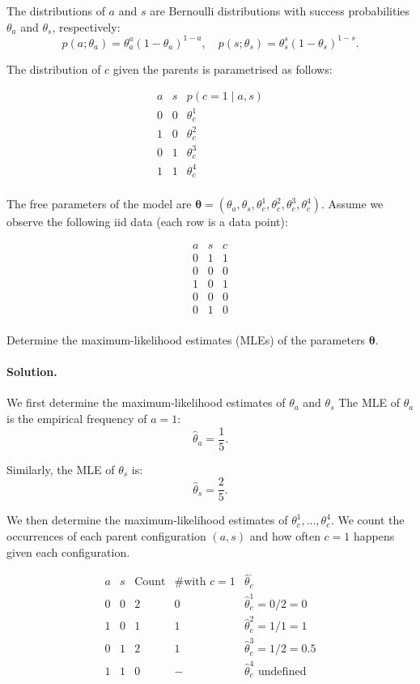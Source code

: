 \documentclass[11pt]{article}
\newif\ifshowanswers
\begin{document}
\noindent
The distributions of $a$ and $s$ are Bernoulli distributions with success probabilities $\theta_a$ and $\theta_s$, respectively:
\[
p(a; \theta_a) = \theta_a^a (1 - \theta_a)^{1 - a}, \quad p(s; \theta_s) = \theta_s^s (1 - \theta_s)^{1 - s}.
\]

\noindent
The distribution of $c$ given the parents is parametrised as follows:

\[
\begin{array}{cc|c}
  a & s & p(c = 1 \mid a, s) \\
\hline
0 & 0 & \theta_c^1 \\
1 & 0 & \theta_c^2 \\
0 & 1 & \theta_c^3 \\
1 & 1 & \theta_c^4 \\
\end{array}
\]

\noindent
The free parameters of the model are $\bm{\theta} = (\theta_a, \theta_s, \theta_c^1, \theta_c^2, \theta_c^3, \theta_c^4)$. Assume we observe the following iid data (each row is a data point):

\[
\begin{array}{cc|c}
a & s & c \\
\hline
0 & 1 & 1 \\
0 & 0 & 0 \\
1 & 0 & 1 \\
0 & 0 & 0 \\
0 & 1 & 0 \\
\end{array}
\]

\noindent
Determine the maximum-likelihood estimates (MLEs) of the parameters $\bm{\theta}$.

\ifshowanswers
\paragraph{Solution.}
We first determine the maximum-likelihood estimates of $\theta_a$ and $\theta_s$
The MLE of $\theta_a$ is the empirical frequency of $a=1$:
\[
\hat{\theta}_a = \frac{1}{5}.
\]

Similarly, the MLE of $\theta_s$ is:
\[
\hat{\theta}_s = \frac{2}{5}.
\]

\noindent
We then determine the maximum-likelihood estimates of $\theta_c^1, \ldots, \theta_c^4$.
We count the occurrences of each parent configuration $(a, s)$ and how often $c=1$ happens given each configuration.

\[
\begin{array}{cccc|l}
a & s & \text{Count} & \text{\# with } c=1 & \hat{\theta}_c^{\cdot} \\
\hline
0 & 0 & 2 & 0 & \hat{\theta}_c^1 = 0/2 = 0 \\
1 & 0 & 1 & 1 & \hat{\theta}_c^2 = 1/1 = 1 \\
0 & 1 & 2 & 1 & \hat{\theta}_c^3 = 1/2 = 0.5 \\
1 & 1 & 0 & - & \hat{\theta}_c^4 \text{ undefined} \\
\end{array}
\]
\end{document}
